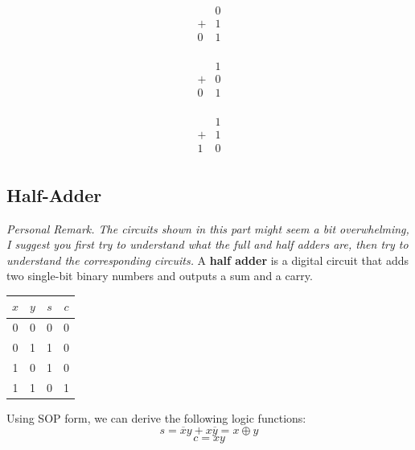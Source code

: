 \documentclass[12pt,openany]{book}
\newcommand*\xor{\oplus}
\begin{document}
					\[
					\begin{array}{cccccc}
					& 0 \\
					+ & 1 \\
					\hline
					0 & 1 \\
					\end{array}
					\]
					
					\[
					\begin{array}{cccccc}
					& 1 \\
					+ & 0 \\
					\hline
					0 & 1 \\
					\end{array}
					\]
					
					\[
					\begin{array}{cccccc}
					& 1 \\
					+ & 1 \\
					\hline
					1 & 0 \\
					\end{array}
					\]
					


			      	
			      	\newpage
			      	\subsection{Half-Adder}
			      	\textit{Personal Remark. The circuits shown in this part might seem a bit overwhelming, I suggest you first try to understand what the full and half adders are, then try to understand the corresponding circuits.} 
			      	\newline
			      	\vspace{10px}
			      	A \textbf{half adder} is a digital circuit that adds two single-bit binary numbers and outputs a sum and a carry. 
			      	
			      	
			     \begin{minipage}[htp]{0.45\textwidth} %
					

			      		\centering
			      		\begin{tabular}{cccc}
			      			\hline
			      			$x$ & $y$ & $s$ & $c$ \\
			      			\hline
			      			0   & 0   & 0   & 0   \\
			      			0   & 1   & 1   & 0   \\
			      			1   & 0   & 1   & 0   \\
			      			1   & 1   & 0   & 1   \\
			      			\hline
			      		\end{tabular}
					\end{minipage}
					\hfill
			      	\vline
					\hfill
					\begin{minipage}[htp]{0.45\textwidth} %
					Using SOP form, we can derive the following logic functions:
			      	$$ s = \overline{x}y + x\overline{y} = x \xor y$$
			      	$$ c = xy$$
				\end{minipage}
			      	
\end{document}
